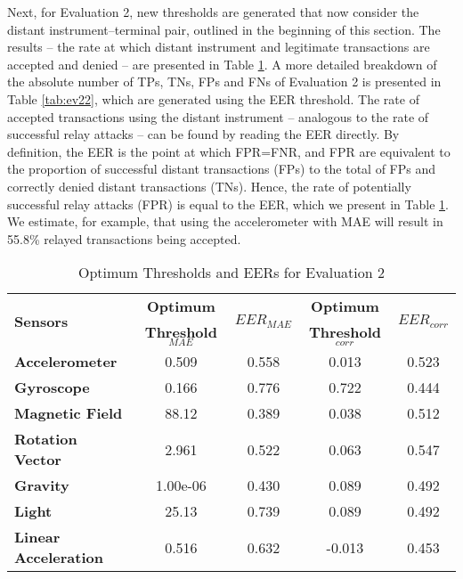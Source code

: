 \documentclass[runningheads,a4paper]{llncs}
\begin{document}
Next, for Evaluation 2, new thresholds are generated that now consider the distant instrument--terminal pair, outlined in the beginning of this section. The results -- the rate at which distant instrument and legitimate transactions are accepted and denied -- are presented in Table \ref{tab:ev2}.  A more detailed breakdown of the absolute number of TPs, TNs, FPs and FNs of Evaluation 2 is presented in Table \ref{tab:ev22}, which are generated using the EER threshold.  The rate of accepted transactions using the distant instrument -- analogous to the rate of successful relay attacks -- can be found by reading the EER directly.  By definition, the EER is the point at which FPR=FNR, and FPR are equivalent to the proportion of successful distant transactions (FPs) to the total of FPs and correctly denied distant transactions (TNs).  Hence, the rate of potentially successful relay attacks (FPR) is equal to the EER, which we present in Table \ref{tab:ev2}.  We estimate, for example, that using the accelerometer with MAE will result in 55.8\% relayed transactions being accepted.

\begin{table}[ht]
	\centering
	\caption{Optimum Thresholds and EERs for Evaluation 2}
	\label{tab:ev2}
\begin{tabular}{@{}lcccc@{}}
			\toprule
			\multirow{2}{*}{\textbf{Sensors}} & \textbf{Optimum} & \multirow{2}{*}{\textbf{$EER_{MAE}$}} & \textbf{Optimum} & \multirow{2}{*}{\textbf{$EER_{corr}$}} \\ 
			& \textbf{Threshold$_{MAE}$} & & \textbf{Threshold$_{corr}$}& \\
			\midrule
			\textbf{Accelerometer} & 0.509 & 0.558 & 0.013 & 0.523 \\
			\textbf{Gyroscope} & 0.166 & 0.776 & 0.722 & 0.444 \\
			\textbf{Magnetic Field} & 88.12 & 0.389 & 0.038 & 0.512 \\
			\textbf{Rotation Vector} & 2.961 & 0.522 & 0.063 & 0.547 \\
			\textbf{Gravity} & 1.00e-06 & 0.430 & 0.089 & 0.492 \\
			\textbf{Light} & 25.13 & 0.739 & 0.089 & 0.492 \\
			\textbf{Linear Acceleration} & 0.516 & 0.632 & -0.013 & 0.453 \\
			\bottomrule
		\end{tabular}

\end{table}
\end{document}
